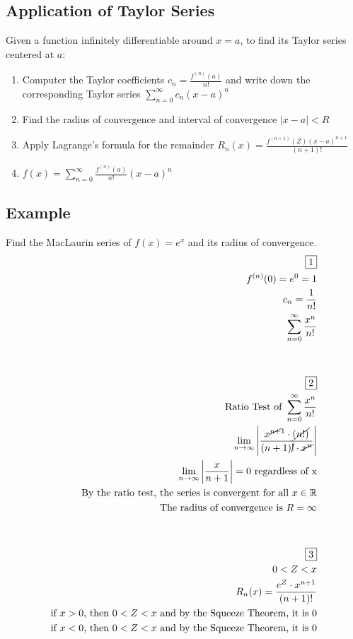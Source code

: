 \documentclass{article}
\begin{document}
\subsection*{Application of Taylor Series}
Given a function infinitely differentiable around $x=a$, to find its Taylor series centered at $a$:\\
\begin{enumerate}
\item Computer the Taylor coefficients $c_n=\frac{f^{(n)}(a)}{n!}$ and write down the corresponding Taylor series $\displaystyle \sum^\infty_{n=0}c_n(x-a)^n$
\item Find the radius of convergence and interval of convergence $|x-a|<R$
\item Apply Lagrange's formula for the remainder $R_n(x)=\frac{f^{(n+1)}(Z)(x-a)^{n+1}}{(n+1)!}$
\item $f(x)=\displaystyle \sum^\infty_{n=0}\frac{f^{(n)}(a)}{n!}(x-a)^n$
\end{enumerate}
\subsection*{Example}
Find the MacLaurin series of $f(x)=e^x$ and its radius of convergence.
\begin{equation}
\begin{aligned}
\boxed{1}\\
f^{(n)}(0)=e^0=1\\
c_n=\frac{1}{n!}\\
\displaystyle \sum^\infty_{n=0}\frac{x^n}{n!}\\\\\\
\boxed{2}\\
\text{Ratio Test of }\sum^\infty_{n=0}\frac{x^n}{n!}\\
\lim_{n\to\infty}\left|\frac{x^{\cancel{n+}1} \cdot \cancel{(n!)}}{(n+1)\cancel{!} \cdot \cancel{x^n}}\right|\\
\lim_{n\to\infty}\left|\frac{x}{n+1}\right|=0 \text{ regardless of x}\\
\text{By the ratio test, the series is convergent for all }x\in \mathbb{R}\\
\text{The radius of convergence is }R=\infty\\\\\\
\boxed{3}\\
0 < Z < x\\
R_n(x)=\frac{e^Z \cdot x^{n+1}}{(n+1)!}\\
\text{if }x>0\text{, then }0<Z<x\text{ and by the Squeeze Theorem, it is }0\\
\text{if }x<0\text{, then }0<Z<x\text{ and by the Squeeze Theorem, it is }0\\
\end{aligned}
\end{equation}
\end{document}

